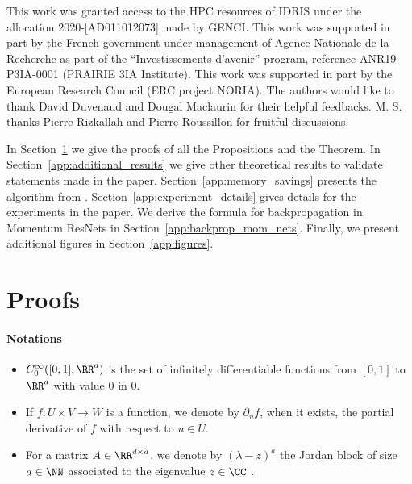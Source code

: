 \documentclass{article}
\begin{document}
This work was granted access to the HPC resources of IDRIS under the allocation 2020-[AD011012073] made by GENCI. This work was supported in part by the French government under management of Agence Nationale de la Recherche as part of the “Investissements d’avenir” program, reference ANR19-P3IA-0001 (PRAIRIE 3IA Institute). This work was
supported in part by the European Research Council (ERC project NORIA).  The authors would like to thank David Duvenaud and Dougal Maclaurin for their helpful feedbacks.  M. S. thanks Pierre Rizkallah and Pierre Roussillon for fruitful discussions. 




\onecolumn

\appendix

In Section~\ref{app:proofs} we give the proofs of all the Propositions and the Theorem. In Section~\ref{app:additional_results} we give other theoretical results to validate statements made in the paper. Section~\ref{app:memory_savings} presents the algorithm from \citet{10.5555/3045118.3045343}.  Section~\ref{app:experiment_details} gives details for the experiments in the paper. We derive the formula for backpropagation in Momentum ResNets in Section~\ref{app:backprop_mom_nets}. Finally, we present additional figures in Section~\ref{app:figures}.

\section{Proofs}\label{app:proofs}

\paragraph{Notations}
\begin{itemize}
    \item $C_0^{\infty}([0,1],\RR^d)$ is the set of  infinitely differentiable functions from $[0,1]$ to $\RR^d$ with value $0$ in $0$.
    \item If $f : U \times V \to W$ is a function, we denote by $\partial_u f$, when it exists, the partial derivative of $f$ with respect to $u \in U$.
    \item For a matrix $A \in \RR^{d\times d}$, we denote by $(\lambda - z)^a$ the Jordan block of size $a \in \NN$ associated to the eigenvalue $z \in \CC$ .
\end{itemize}




\setcounter{subsection}{-1}
\end{document}
